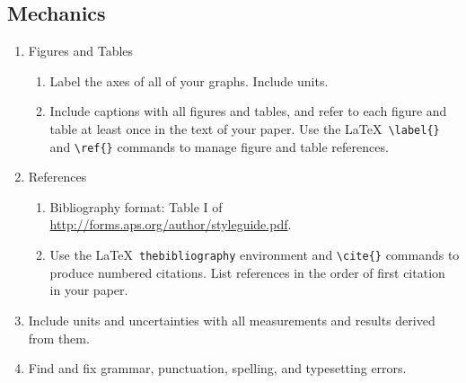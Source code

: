 \documentclass[11 pt]{article}
\begin{document}
\subsection*{Mechanics}
\begin{enumerate}
\item Figures and Tables
  \begin{enumerate}
  \item Label the axes of all of your graphs. Include units.

  \item Include captions with all figures and tables, and refer to
    each figure and table at least once in the text of your
    paper. Use the \LaTeX\ \verb+\label{}+ and \verb+\ref{}+
    commands to manage figure and table references.

  \end{enumerate}

\item References 
  \begin{enumerate}
  \item Bibliography format: Table I of 
    \url{http://forms.aps.org/author/styleguide.pdf}.

  \item Use the \LaTeX\ \verb+thebibliography+ environment and
    \verb+\cite{}+ commands to produce numbered citations. List
    references in the order of first citation in your paper.
  \end{enumerate}

\item Include units and uncertainties with all measurements and
  results derived from them.

\item Find and fix grammar, punctuation, spelling, and typesetting
  errors.

\end{enumerate}
\end{document}
